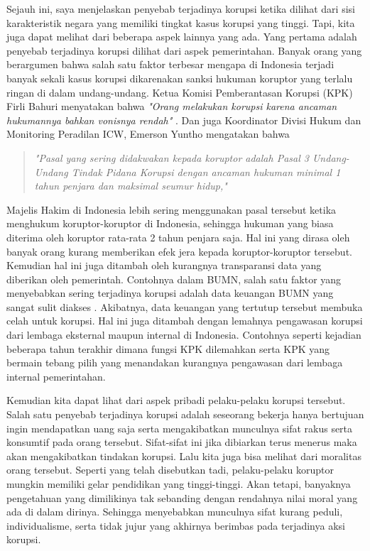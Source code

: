 \documentclass[11pt]{article}
\begin{document}
Sejauh ini, saya menjelaskan penyebab terjadinya korupsi ketika dilihat dari
sisi karakteristik negara yang memiliki tingkat kasus korupsi yang tinggi. Tapi,
kita juga dapat melihat dari beberapa aspek lainnya yang ada. Yang pertama adalah 
penyebab terjadinya korupsi dilihat dari aspek pemerintahan. Banyak orang yang
berargumen bahwa salah satu faktor terbesar mengapa di Indonesia terjadi banyak
sekali kasus korupsi dikarenakan sanksi hukuman koruptor yang terlalu ringan di 
dalam undang-undang. Ketua Komisi Pemberantasan Korupsi (KPK) Firli Bahuri menyatakan
bahwa \emph{"Orang melakukan korupsi karena ancaman hukumannya bahkan vonisnya rendah"}
\citep{okezoneKetuaKPKKorupsi2020}. Dan juga
Koordinator Divisi Hukum dan Monitoring Peradilan ICW, Emerson Yuntho mengatakan
bahwa 
\begin{quote}
    \emph{"Pasal yang sering didakwakan kepada koruptor adalah Pasal 3 Undang-Undang
    Tindak Pidana Korupsi dengan ancaman hukuman minimal 1 tahun penjara dan
    maksimal seumur hidup,"}\citep{saputriKenapaHukumanKoruptor2015}
\end{quote}
Majelis Hakim di Indonesia lebih sering menggunakan pasal tersebut ketika menghukum
koruptor-koruptor di Indonesia, sehingga hukuman yang biasa diterima oleh koruptor
rata-rata 2 tahun penjara saja. Hal ini yang dirasa oleh banyak orang kurang
memberikan efek jera kepada koruptor-koruptor tersebut. Kemudian hal ini juga
ditambah oleh kurangnya transparansi data yang diberikan oleh pemerintah. Contohnya
dalam BUMN, salah satu faktor yang menyebabkan sering terjadinya korupsi adalah
data keuangan BUMN yang sangat sulit diakses \citep{alaidrusTransparansiMinimKepentingan}.
Akibatnya, data keuangan yang tertutup tersebut membuka celah untuk korupsi. Hal
ini juga ditambah dengan lemahnya pengawasan korupsi dari lembaga eksternal maupun
internal di Indonesia. Contohnya seperti kejadian beberapa tahun terakhir dimana
fungsi KPK dilemahkan serta KPK yang bermain tebang pilih yang menandakan kurangnya
pengawasan dari lembaga internal pemerintahan. 

Kemudian kita dapat lihat dari aspek pribadi pelaku-pelaku korupsi tersebut. 
Salah satu penyebab terjadinya korupsi adalah seseorang bekerja hanya bertujuan
ingin mendapatkan uang saja serta mengakibatkan munculnya sifat rakus
serta konsumtif pada orang tersebut. Sifat-sifat ini jika dibiarkan terus menerus 
maka akan mengakibatkan tindakan korupsi. Lalu kita juga bisa melihat dari moralitas
orang tersebut. Seperti yang telah disebutkan tadi, pelaku-pelaku koruptor mungkin 
memiliki gelar pendidikan yang tinggi-tinggi. Akan tetapi, banyaknya pengetahuan
yang dimilikinya tak sebanding dengan rendahnya nilai moral yang ada di dalam dirinya.
Sehingga menyebabkan munculnya sifat kurang peduli, individualisme, serta tidak jujur
yang akhirnya berimbas pada terjadinya aksi korupsi. 
\end{document}
